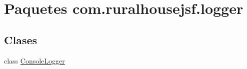 \hypertarget{a00119}{}\section{Paquetes com.\+ruralhousejsf.\+logger}
\label{a00119}
\subsection*{Clases}
\begin{DoxyCompactItemize}
\item 
class \mbox{\hyperlink{a00220}{Console\+Logger}}
\end{DoxyCompactItemize}
